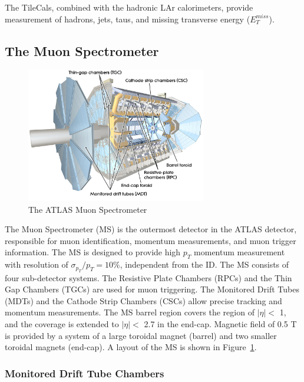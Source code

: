 The TileCals, combined with the hadronic LAr calorimeters, provide measurement of hadrons, jets, taus, and missing transverse energy ($E_{T}^{miss}$).


\subsection{The Muon Spectrometer}
\label{sec:atlas:ms}

\begin{figure}[!htb]
    \includegraphics[width=0.7\textwidth]{figures/ms.png}
    \centering
    \caption{The ATLAS Muon Spectrometer}
    \label{fig:ms}
\end{figure}
The Muon Spectrometer (MS) is the outermost detector in the ATLAS detector, responsible for muon identification, momentum measurements, and muon trigger information. The MS is designed to provide high $p_{T}$ momentum measurement with resolution of $\sigma_{p_{T}} / p_{T} = 10\%$, independent from the ID. The MS consists of four sub-detector systems. The Resistive Plate Chambers (RPCs) and the Thin Gap Chambers (TGCs) are used for muon triggering. The Monitored Drift Tubes (MDTs) and the Cathode Strip Chambers (CSCs) allow precise tracking and momentum measurements. The MS barrel region covers the region of $|\eta|<$ 1, and the coverage is extended to $|\eta|<$ 2.7 in the end-cap. Magnetic field of 0.5 T~\cite{ARNAUD2008265} is provided by a system of a large toroidal magnet (barrel) and two smaller toroidal magnets (end-cap). A layout of the MS is shown in Figure~\ref{fig:ms}.

\subsubsection{Monitored Drift Tube Chambers}
\label{sec:atlas:mdt}

